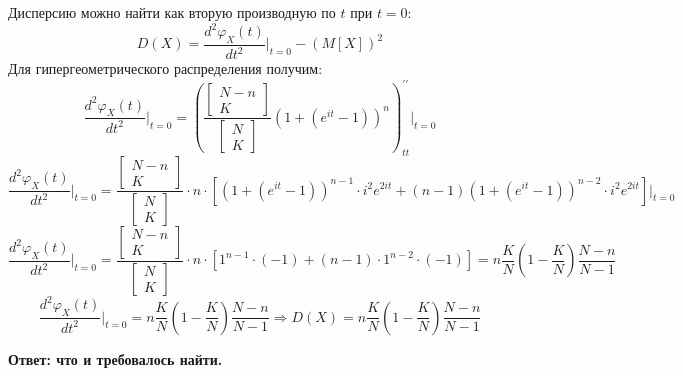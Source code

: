 \documentclass[a4paper, 12pt]{article}
\begin{document}
    Дисперсию можно найти как вторую производную по $t$ при $t=0$:
    $$
    D(X)=\dfrac{d^2\varphi_X(t)}{dt^2}\bigg|_{t=0}-(M[X])^2
    $$
    Для гипергеометрического распределения получим:
    $$
    \dfrac{d^2\varphi_X(t)}{dt^2}\bigg|_{t=0}=
    \left(\dfrac{\begin{bmatrix}N-n\\K\end{bmatrix}}{\begin{bmatrix}N\\K\end{bmatrix}}(1+(e^{it}-1))^n\right)^{\prime\prime}_{tt} \Bigg|_{t=0}
    $$
    $$
    \dfrac{d^2\varphi_X(t)}{dt^2}\bigg|_{t=0}=
    \dfrac{
        \begin{bmatrix}
            N-n\\
            K
        \end{bmatrix}
    }{
        \begin{bmatrix}
            N\\
            K
        \end{bmatrix}
    }
    \cdot n \cdot \left[(1+(e^{it}-1))^{n-1}\cdot i^2e^{2it}+(n-1)(1+(e^{it}-1))^{n-2}\cdot i^2e^{2it}\right]\Bigg|_{t=0}
    $$
    $$
    \dfrac{d^2\varphi_X(t)}{dt^2}\bigg|_{t=0}=
    \dfrac{
        \begin{bmatrix}
            N-n\\
            K
        \end{bmatrix}
    }{
        \begin{bmatrix}
            N\\
            K
        \end{bmatrix}
    }
    \cdot n \cdot \left[1^{n-1}\cdot(-1)+ (n-1)\cdot1^{n-2}\cdot(-1)\right]=n\dfrac{K}{N}\left(1-\dfrac{K}{N}\right)\dfrac{N-n}{N-1}
    $$
    $$
    \dfrac{d^2\varphi_X(t)}{dt^2}\bigg|_{t=0}=
    n\dfrac{K}{N}\left(1-\dfrac{K}{N}\right)\dfrac{N-n}{N-1}\Rightarrow D(X)=n\dfrac{K}{N}\left(1-\dfrac{K}{N}\right)\dfrac{N-n}{N-1}
    $$


    \textbf{Ответ: что и требовалось найти.}
\end{document}
